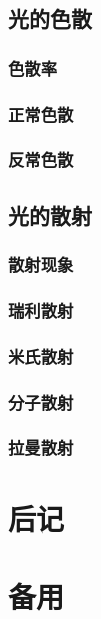 \documentclass[cn,10pt,chinesefont=founder,math=mtpro2,cite=super,toc=onecol,twoside]{elegantbook}
\begin{document}
\section{光的色散}

\subsection{色散率}

\subsection{正常色散}

\subsection{反常色散}

\section{光的散射}

\subsection{散射现象}

\subsection{瑞利散射}

\subsection{米氏散射}

\subsection{分子散射}

\subsection{拉曼散射}










\backmatter
\chapter*{后\hspace{1em}记}

%
\appendix
\chapter{备用}
\end{document}
